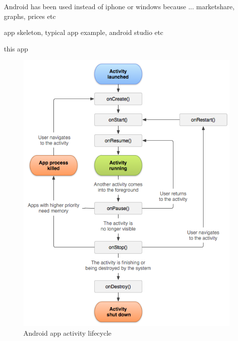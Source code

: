 Android has been used instead of iphone or windows because ... marketshare, graphs, prices etc


app skeleton, typical app example, android studio etc


this app





\begin{figure}[H]
      \centering
      \includegraphics[scale=.8]{images/Diagrams/android_activity_lifecycle.png}
      \caption{Android app activity lifecycle }
      \label{androidActivity}
  \end{figure}
  \bigskip
